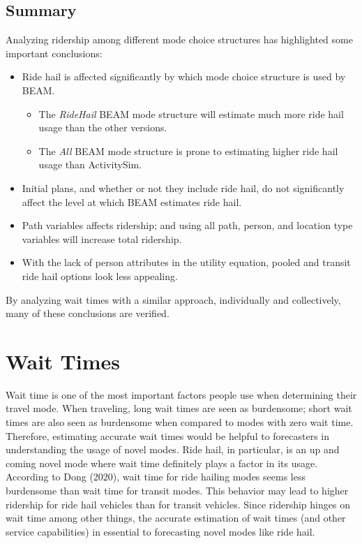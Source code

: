 \documentclass[fancy, masters]{byuthesis}
\begin{document}
\hypertarget{summary}{%
\subsection{Summary}\label{summary}}

Analyzing ridership among different mode choice structures has highlighted some important conclusions:

\begin{itemize}
\item
  Ride hail is affected significantly by which mode choice structure is used by BEAM.

  \begin{itemize}
  \item
    The \emph{RideHail} BEAM mode structure will estimate much more ride hail usage than the other versions.
  \item
    The \emph{All} BEAM mode structure is prone to estimating higher ride hail usage than ActivitySim.
  \end{itemize}
\item
  Initial plans, and whether or not they include ride hail, do not significantly affect the level at which BEAM estimates ride hail.
\item
  Path variables affects ridership; and using all path, person, and location type variables will increase total ridership.
\item
  With the lack of person attributes in the utility equation, pooled and transit ride hail options look less appealing.
\end{itemize}

By analyzing wait times with a similar approach, individually and collectively, many of these conclusions are verified.

\hypertarget{res-waits}{%
\section{Wait Times}\label{res-waits}}

Wait time is one of the most important factors people use when determining their travel mode. When traveling, long wait times are seen as burdensome; short wait times are also seen as burdensome when compared to modes with zero wait time. Therefore, estimating accurate wait times would be helpful to forecasters in understanding the usage of novel modes. Ride hail, in particular, is an up and coming novel mode where wait time definitely plays a factor in its usage. According to Dong (2020), wait time for ride hailing modes seems less burdensome than wait time for transit modes. This behavior may lead to higher ridership for ride hail vehicles than for transit vehicles. Since ridership hinges on wait time among other things, the accurate estimation of wait times (and other service capabilities) in essential to forecasting novel modes like ride hail.
\end{document}
